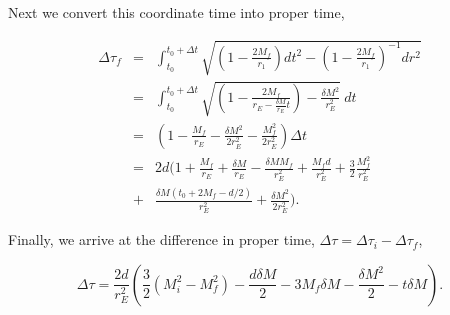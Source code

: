 \documentclass[aps,showpacs,twocolumn,floats,prd,superscriptaddress,nofootinbib]{revtex4-1}
\begin{document}
Next we convert this coordinate time into proper time, 

\begin{eqnarray}
\Delta \tau_f &=& \int_{t_0}^{t_0+\Delta t}
 \sqrt{\left(1-\frac{2M_f}{r_1}\right)dt^2 - \left(1-\frac{2M_f}{r_1}\right)^{-1}dr^2} \nonumber	
 \\ 
&=& \int_{t_0}^{t_0+\Delta t} 
\sqrt{\left(1 - \frac{2M_f}{r_E - \frac{\delta M}{r_E}t}\right) - \frac{\delta M^2}{r_E^2} }
~dt  \nonumber	\\
&=& \left(1 - \frac{M_f}{r_E} - \frac{\delta M^2}{2r_E^2} - \frac{M_f^2}{2 r_E^2} \right)
\Delta t \nonumber \\
&=& 2d ( 1 + \frac{M_f}{r_E} + \frac{\delta M}{r_E} - \frac{\delta M M_f}{r_E^2} + \frac{M_fd}{r_E^2}+ \frac{3}{2} \frac{M_f^2}{r_E^2}	\nonumber	\\
& + & \frac{\delta M (t_0+2M_f-d/2)}{r_E^2} + \frac{\delta M^2}{2r_E^2} ). \label{123}
\end{eqnarray}

Finally, we arrive at the difference in proper time, $\Delta \tau = \Delta \tau_i - \Delta \tau_f$, 

\begin{equation}
	\Delta \tau=  \frac{2d}{r_E^2} \left( \frac{3}{2} (M_i^2 - M_f^2) - \frac{d \delta M}{2} - 3 M_f \delta M - \frac{\delta M^2}{2} - t \delta M  \right).
\end{equation}



\end{document}
